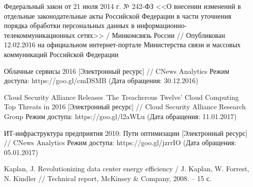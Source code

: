 \begin{thebibliography}{00}
    Федеральный закон от 21 июля 2014 г. № 242-ФЗ <<О внесении изменений в отдельные законодательные акты Российской Федерации в части уточнения порядка обработки персональных данных в информационно-телекоммуникационных сетях>> /
    Минкомсвязь России //
    Опубликован 12.02.2016 на официальном интернет-портале Министерства связи и массовых коммуникаций Российской Федерации

    Облачные сервисы 2016
    [Электронный ресурс] //
    CNews Analytics
    Режим доступа: https://goo.gl/cmDSMB
    (Дата обращения: 30.12.2016)

    Cloud Security Alliance Releases 'The Treacherous Twelve' Cloud Computing Top Threats in 2016
    [Электронный ресурс] //
    Cloud Security Alliance Research Group
    Режим доступа: https://goo.gl/l2aWLu
    (Дата обращения: 11.01.2017)

    ИТ-инфраструктура предприятия 2010: Пути оптимизации
    [Электронный ресурс] //
    CNews Analytics
    Режим доступа: https://goo.gl/jzrrIO
    (Дата обращения: 05.01.2017)

    Kaplan, J.
    Revolutionizing data center energy efficiency /
    J. Kaplan, W. Forrest, N. Kindler //
    Technical report, McKinsey \& Company, 2008. -- 15 с.

\end{thebibliography}
\endgroup

\clearpage
